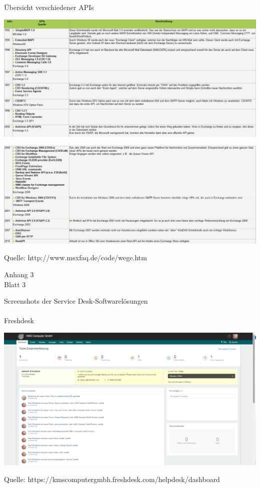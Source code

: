 \noindent Übersicht verschiedener APIs
\begin{flushleft}
\includegraphics[width=1.0\textwidth]{Abbildungen/API_1.png}
\end{flushleft}
\label{API_1}
\begin{flushleft}
\includegraphics[width=1.0\textwidth]{Abbildungen/API_2.png}
\end{flushleft}
\noindent Quelle: http://www.msxfaq.de/code/wege.htm

\newpage

\begin{flushright}
Anhang 3\\
Blatt 3\\
\end{flushright}

\noindent Screenshots der Service Desk-Softwarelösungen \\\\
\noindent Freshdesk
\begin{flushleft}
\includegraphics[width=1.0\textwidth]{Abbildungen/Freshdesk.png}
\end{flushleft}
\noindent Quelle: https://kmscomputergmbh.freshdesk.com/helpdesk/dashboard \\\\


